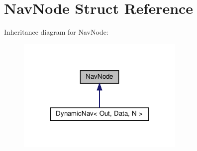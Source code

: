 \hypertarget{structNavNode}{}\section{Nav\+Node Struct Reference}
\label{structNavNode}


Inheritance diagram for Nav\+Node\+:\nopagebreak
\begin{figure}[H]
\begin{center}
\leavevmode
\includegraphics[width=228pt]{structNavNode__inherit__graph}
\end{center}
\end{figure}
